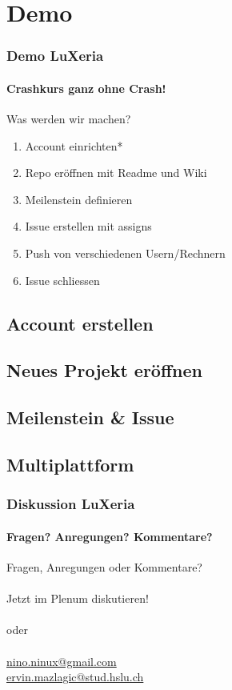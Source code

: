 \section{Demo}

\begin{frame}
    \frametitle{Demo \hfill{} LuXeria}
    \framesubtitle{Crashkurs ganz ohne Crash!}
    \begin{block}{Was werden wir machen?}
        \begin{enumerate}
            \item Account einrichten*
            \item Repo eröffnen mit Readme und Wiki
            \item Meilenstein definieren
            \item Issue erstellen mit assigns
            \item Push von verschiedenen Usern/Rechnern
            \item Issue schliessen
    \end{enumerate}
    \end{block}
\end{frame}

\subsection{Account erstellen}
\begin{frame}
\end{frame}

\subsection{Neues Projekt eröffnen}
\begin{frame}
\end{frame}

\subsection{Meilenstein \& Issue}
\begin{frame}
\end{frame}

\subsection{Multiplattform}
\begin{frame}
\end{frame}

\begin{frame}\thispagestyle{empty}
	\frametitle{Diskussion \hfill{} \footnotesize{LuXeria}}
	\framesubtitle{Fragen? Anregungen? Kommentare?}
	\begin{center}
	\Large
	Fragen, Anregungen oder Kommentare?\\~\\
	Jetzt im Plenum diskutieren!\\~\\
	oder\\~\\
	\url{nino.ninux@gmail.com}\\
	\url{ervin.mazlagic@stud.hslu.ch}
	\end{center}
\end{frame}

